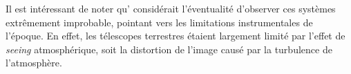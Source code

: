 
Il est intéressant de noter qu'\citet{Einstein1936} 
considérait l'éventualité d'observer ces systèmes extrêmement 
improbable, pointant vers les limitations instrumentales de l'époque. En effet, les télescopes terrestres étaient 
largement limité par l'effet de \textit{seeing} atmosphérique, soit la distortion de l'image causé par la turbulence de 
l'atmosphère.

